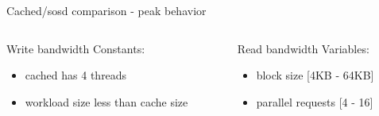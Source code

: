 \begin{frame}{Cached/sosd comparison - peak behavior}
	\begin{columns}[t]
		\begin{column}{.5\textwidth}
			Write bandwidth
			Constants:
			\begin{itemize}
				\item cached has 4 threads
				\item workload size less than cache size
			\end{itemize}
		\end{column}
		\begin{column}{.5\textwidth}
			Read bandwidth
			Variables:
			\begin{itemize}
				\item block size [4KB - 64KB]
				\item parallel requests [4 - 16]
			\end{itemize}
		\end{column}
	\end{columns}

\end{frame}

